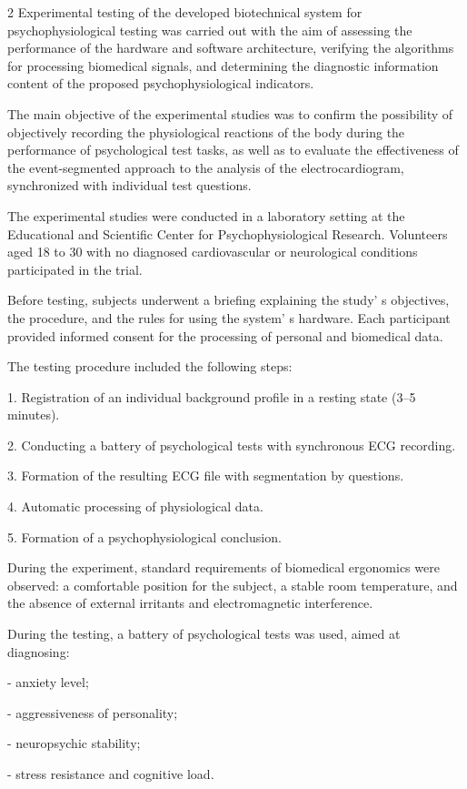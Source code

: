 \begin{multicols}{2}
Experimental testing of the developed biotechnical system for
psychophysiological testing was carried out with the aim of assessing
the performance of the hardware and software architecture, verifying the
algorithms for processing biomedical signals, and determining the
diagnostic information content of the proposed psychophysiological
indicators.

The main objective of the experimental studies was to confirm the
possibility of objectively recording the physiological reactions of the
body during the performance of psychological test tasks, as well as to
evaluate the effectiveness of the event-segmented approach to the
analysis of the electrocardiogram, synchronized with individual test
questions.

The experimental studies were conducted in a laboratory setting at the
Educational and Scientific Center for Psychophysiological Research.
Volunteers aged 18 to 30 with no diagnosed cardiovascular or
neurological conditions participated in the trial.

Before testing, subjects underwent a briefing explaining the
study' s objectives, the procedure, and the rules for
using the system' s hardware. Each participant provided
informed consent for the processing of personal and biomedical data.

The testing procedure included the following steps:

1. Registration of an individual background profile in a resting state
(3--5 minutes).

2. Conducting a battery of psychological tests with synchronous ECG
recording.

3. Formation of the resulting ECG file with segmentation by questions.

4. Automatic processing of physiological data.

5. Formation of a psychophysiological conclusion.

During the experiment, standard requirements of biomedical ergonomics
were observed: a comfortable position for the subject, a stable room
temperature, and the absence of external irritants and electromagnetic
interference.

During the testing, a battery of psychological tests was used, aimed at
diagnosing:

- anxiety level;

- aggressiveness of personality;

- neuropsychic stability;

- stress resistance and cognitive load.


\end{multicols}

